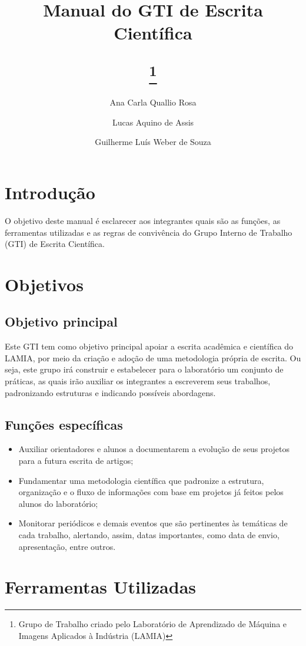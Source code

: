 \documentclass{article}
\title{Manual do GTI de Escrita Científica 
	\author{
		Ana Carla Quallio Rosa
		\and
		Lucas Aquino de Assis
		\and
		Guilherme Luís Weber de Souza
	}
	\thanks{Grupo de Trabalho criado pelo Laboratório de Aprendizado de Máquina e Imagens Aplicados à Indústria (LAMIA)}
}
\begin{document}
\begin{titlepage}
\maketitle
\end{titlepage}
\newpage
\tableofcontents
\newpage
\section*{Introdução}
O objetivo deste manual é esclarecer aos integrantes quais são as funções, as ferramentas utilizadas e as regras de convivência do Grupo Interno de Trabalho (GTI) de Escrita Científica.

\section{Objetivos}
\subsection{Objetivo principal}
Este GTI tem como objetivo principal apoiar a escrita acadêmica e científica do LAMIA, por meio da criação e adoção de uma metodologia própria de escrita. Ou seja, este grupo irá construir e estabelecer para o laboratório um conjunto de práticas, as quais irão auxiliar os integrantes a escreverem seus trabalhos, padronizando estruturas e indicando possíveis abordagens. 

\subsection{Funções específicas}
\begin{itemize}
  \item Auxiliar orientadores e alunos a documentarem a evolução de seus projetos para a futura escrita de artigos;
  \item Fundamentar uma metodologia científica que padronize a estrutura, organização e o fluxo de informações com base em projetos já feitos pelos alunos do laboratório;
  \item Monitorar periódicos e demais eventos que são pertinentes às temáticas de cada trabalho, alertando, assim, datas importantes, como data de envio, apresentação, entre outros.
\end{itemize}

\section{Ferramentas Utilizadas}
\end{document}
